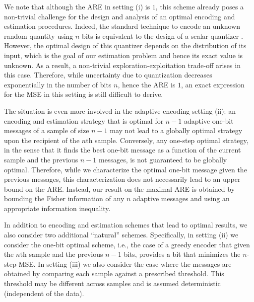 \documentclass[letterpaper, 11pt]{IEEEtran}      %
\begin{document}
We note that although the ARE in setting (i) is $1$, this scheme already poses a non-trivial challenge for the design and analysis of an optimal encoding and estimation procedures. Indeed, the standard technique to encode an unknown random quantity using $n$ bits is equivalent to the design of a scalar quantizer \cite{gray1998quantization}. However, the optimal design of this quantizer depends on the distribution of its input, which is the goal of our estimation problem and hence its exact value is unknown. As a result, a non-trivial exploration-exploitation trade-off arises in this case. 
Therefore, while uncertainty due to quantization decreases exponentially in the number of bits $n$, hence the ARE is $1$, an exact expression for the MSE in this setting is still difficult to derive. \par
%
The situation is even more involved in the adaptive encoding setting (ii): an encoding and estimation strategy that is optimal for $n-1$ adaptive one-bit messages of a sample of size $n-1$ may not lead to a globally optimal strategy upon the recipient of the $n$th sample. Conversely, any one-step optimal strategy, in the sense that it finds the best one-bit message as a function of the current sample and the previous $n-1$ messages, is not guaranteed to be globally optimal. Therefore, while we characterize the optimal one-bit message given the previous messages, this characterization does not necessarily lead to an upper bound on the ARE. Instead, our result on the maximal ARE is obtained by bounding the Fisher information of any $n$ adaptive messages and using an appropriate information inequality. \par
In addition to encoding and estimation schemes that lead to optimal results, we also consider two additional ``natural'' schemes. Specifically, in setting (ii) we consider the one-bit optimal scheme, i.e., the case of a greedy encoder that given the $n$th sample and the previous $n-1$ bits, provides a bit that minimizes the $n$-step MSE. In setting (iii) we also consider the case where the messages are obtained by comparing each sample against a prescribed threshold. This threshold may be different across samples and is assumed deterministic (independent of the data). 

\end{document}
